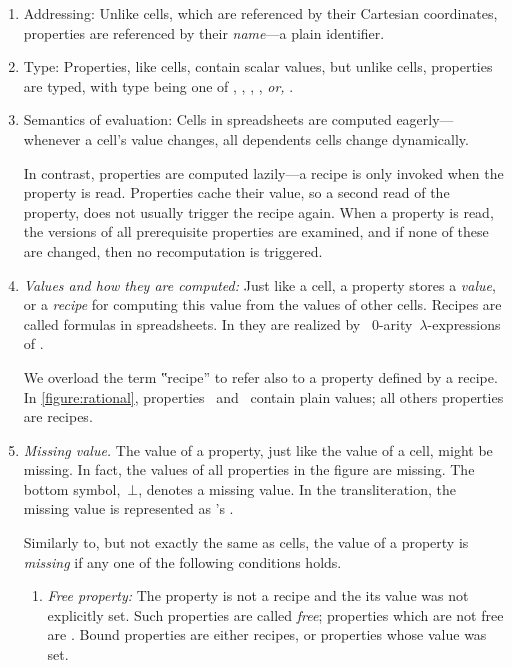 \begin{enumerate}
  \item{Addressing:} Unlike cells, which are referenced by their Cartesian coordinates,
  properties are referenced by their \emph{name}---a plain identifier.

  \item{Type:} Properties, like cells, contain scalar values, but unlike cells,
  properties are typed, with type being one of , ,
  , , \emph{or,} .

  \item{Semantics of evaluation:} Cells in spreadsheets are computed
  eagerly---whenever a cell's value changes, all dependents cells change
  dynamically.

  In contrast, properties are computed lazily---a recipe is only invoked
  when the property is read. Properties cache their value, so a second read
  of the property, does not usually trigger the recipe again. 
  When a property is read, the versions of all prerequisite
  properties are examined, and if none of these are changed, then no
  recomputation is triggered.

  \item\emph{Values and how they are computed:} Just like a cell, a property
  stores a \emph{value}, or a \emph{recipe} for computing this value from the
  values of other cells.
  Recipes are called formulas in spreadsheets. In \Reap they are realized
  by \Java~$0$-arity~$λ$-expressions of \Java.

  We overload the term ‟recipe” to refer also to a property defined by a recipe.
  In \cref{figure:rational}, properties~ and~ contain plain values; all others properties
  are recipes.

  \item\emph{Missing value.} The value of a property, just like the value
  of a cell, might be missing. In fact, the values of all properties in
  the figure are missing. The bottom symbol,~$⊥$, denotes a missing value.
  In the transliteration, the missing value is represented as \Java's
  .

  Similarly to, but not exactly the same as cells, the value of a property
  is \emph{missing} if any one of the following conditions holds.

  \begin{enumerate}
    \item \emph{Free property:} The property is not a recipe and the its
          value was not explicitly set. Such properties are called \emph{free};
          properties which are not free are .
          Bound properties are either recipes, or properties whose value was
          set.


\end{enumerate}
\end{enumerate}
